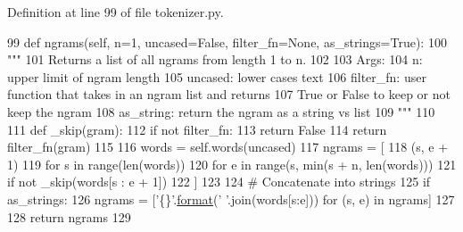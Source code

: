 Definition at line 99 of file tokenizer.\+py.


\begin{DoxyCode}
99     \textcolor{keyword}{def }ngrams(self, n=1, uncased=False, filter\_fn=None, as\_strings=True):
100         \textcolor{stringliteral}{"""}
101 \textcolor{stringliteral}{        Returns a list of all ngrams from length 1 to n.}
102 \textcolor{stringliteral}{}
103 \textcolor{stringliteral}{        Args:}
104 \textcolor{stringliteral}{            n: upper limit of ngram length}
105 \textcolor{stringliteral}{            uncased: lower cases text}
106 \textcolor{stringliteral}{            filter\_fn: user function that takes in an ngram list and returns}
107 \textcolor{stringliteral}{              True or False to keep or not keep the ngram}
108 \textcolor{stringliteral}{            as\_string: return the ngram as a string vs list}
109 \textcolor{stringliteral}{        """}
110 
111         \textcolor{keyword}{def }\_skip(gram):
112             \textcolor{keywordflow}{if} \textcolor{keywordflow}{not} filter\_fn:
113                 \textcolor{keywordflow}{return} \textcolor{keyword}{False}
114             \textcolor{keywordflow}{return} filter\_fn(gram)
115 
116         words = self.words(uncased)
117         ngrams = [
118             (s, e + 1)
119             \textcolor{keywordflow}{for} s \textcolor{keywordflow}{in} range(len(words))
120             \textcolor{keywordflow}{for} e \textcolor{keywordflow}{in} range(s, min(s + n, len(words)))
121             \textcolor{keywordflow}{if} \textcolor{keywordflow}{not} \_skip(words[s : e + 1])
122         ]
123 
124         \textcolor{comment}{# Concatenate into strings}
125         \textcolor{keywordflow}{if} as\_strings:
126             ngrams = [\textcolor{stringliteral}{'\{\}'}.\hyperlink{namespaceparlai_1_1chat__service_1_1services_1_1messenger_1_1shared__utils_a32e2e2022b824fbaf80c747160b52a76}{format}(\textcolor{stringliteral}{' '}.join(words[s:e])) \textcolor{keywordflow}{for} (s, e) \textcolor{keywordflow}{in} ngrams]
127 
128         \textcolor{keywordflow}{return} ngrams
129 
\end{DoxyCode}
\mbox{\label{classparlai_1_1agents_1_1tfidf__retriever_1_1tokenizers_1_1tokenizer_1_1Tokens_ad64d5292cef77a2a02193ba836875ba7}} 
